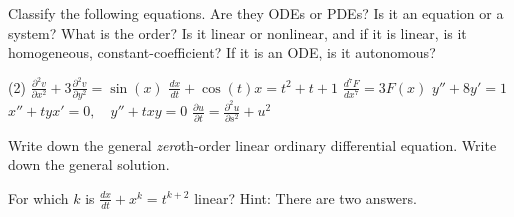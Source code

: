 \begin{exercise}
Classify the following equations.  Are they ODEs or PDEs?  Is it an equation
or a system?  What is the order?  Is it linear or nonlinear, and if it is
linear, is it homogeneous, constant-coefficient?  If it is an ODE\@, is it
autonomous?
\begin{tasks}(2)
\task $\displaystyle \frac{\partial^2 v}{\partial x^2} + 3 \frac{\partial^2
v}{\partial y^2} = \sin(x)$
\task $\displaystyle \frac{d x}{dt} + \cos(t) x = t^2+t+1$
\task $\displaystyle \frac{d^7 F}{dx^7} = 3F(x)$
\task $\displaystyle y''+8y'=1$
\task $\displaystyle x''+tyx'=0, \quad y''+txy = 0$
\task $\displaystyle \frac{\partial u}{\partial t} = \frac{\partial^2 u}{\partial s^2} + u^2$
\end{tasks}
\end{exercise}

\begin{exercise}
Write down the general \emph{zero}th-order linear ordinary differential
equation.  Write down the general solution.
\end{exercise}

\begin{exercise}
For which $k$ is $\frac{dx}{dt}+x^k = t^{k+2}$ linear?  Hint: There are two answers.
\end{exercise}

